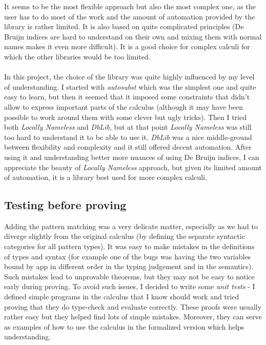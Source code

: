 \documentclass[runningheads]{article}
\begin{document}
It seems to be the most flexible approach but also the most complex one, as the user has to do most of the work and the amount of automation provided by the library is rather limited. It is also based on quite complicated principles (De Bruijn indices are hard to understand on their own and mixing them with normal names makes it even more difficult). It is a good choice for complex calculi for which the other libraries would be too limited.

\paragraph{}

In this project, the choice of the library was quite highly influenced by my level of understanding. I started with \textit{autosubst} which was the simplest one and quite easy to learn, but then it seemed that it imposed some constraints that didn't allow to express important parts of the calculus (although it may have been possible to work around them with some clever but ugly tricks). Then I tried both \textit{Locally Nameless} and \textit{DbLib}, but at that point \textit{Locally Nameless} was still too hard to understand it to be able to use it. \textit{DbLib} was a nice middle-ground between flexibility and complexity and it still offered decent automation. After using it and understanding better more nuances of using De Bruijn indices, I can appreciate the beauty of \textit{Locally Nameless} approach, but given its limited amount of automation, it is a library best used for more complex calculi.

\subsection{Testing before proving}
Adding the pattern matching was a very delicate matter, especially as we had to diverge slightly from the original calculus (by defining the separate syntactic categories for all pattern types). It was easy to make mistakes in the definitions of types and syntax (for example one of the bugs was having the two variables bound by app in different order in the typing judgement and in the semantics). Such mistakes lead to unprovable theorems, but they may not be easy to notice early during proving. To avoid such issues, I decided to write some \emph{unit tests} - I defined simple programs in the calculus that I know should work and tried proving that they do type-check and evaluate correctly. These proofs were usually rather easy but they helped find lots of simple mistakes. Moreover, they can serve as examples of how to use the calculus in the formalized version which helps understanding.
\end{document}
